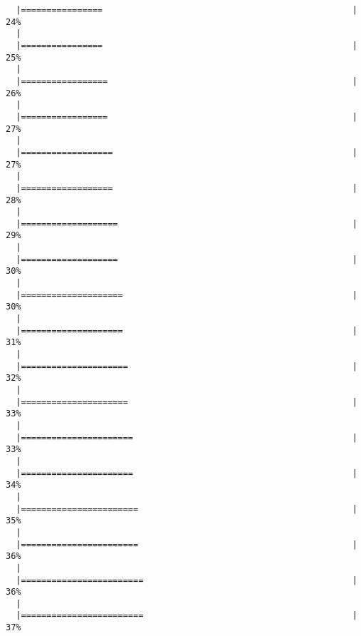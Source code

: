 \documentclass[a4paper]{article}
\begin{document}
\begin{verbatim}
  |================                                                 |  24%
  |                                                                       
  |================                                                 |  25%
  |                                                                       
  |=================                                                |  26%
  |                                                                       
  |=================                                                |  27%
  |                                                                       
  |==================                                               |  27%
  |                                                                       
  |==================                                               |  28%
  |                                                                       
  |===================                                              |  29%
  |                                                                       
  |===================                                              |  30%
  |                                                                       
  |====================                                             |  30%
  |                                                                       
  |====================                                             |  31%
  |                                                                       
  |=====================                                            |  32%
  |                                                                       
  |=====================                                            |  33%
  |                                                                       
  |======================                                           |  33%
  |                                                                       
  |======================                                           |  34%
  |                                                                       
  |=======================                                          |  35%
  |                                                                       
  |=======================                                          |  36%
  |                                                                       
  |========================                                         |  36%
  |                                                                       
  |========================                                         |  37%

\end{verbatim}
\end{document}
